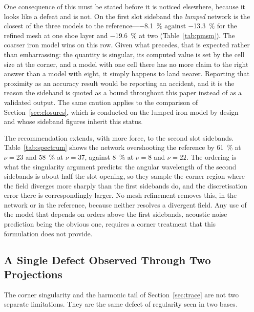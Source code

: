 \documentclass[10pt,a4paper,twocolumn]{article}
\theoremstyle{plain}
\theoremstyle{remark}
\begin{document}
One consequence of this must be stated before it is noticed elsewhere,
because it looks like a defeat and is not. On the first slot sideband
the \emph{lumped} network is the closest of the three models to the
reference---\SI{-8.1}{\percent} against \SI{-13.3}{\percent} for the
refined mesh at one shoe layer and \SI{-19.6}{\percent} at two
(Table~\ref{tab:pmsm}). The coarser iron model wins on this row. Given
what precedes, that is expected rather than embarrassing: the quantity
is singular, its computed value is set by the cell size at the corner,
and a model with one cell there has no more claim to the right answer
than a model with eight, it simply happens to land nearer. Reporting
that proximity as an accuracy result would be reporting an accident, and
it is the reason the sideband is quoted as a bound throughout this paper
instead of as a validated output. The same caution applies to the
comparison of Section~\ref{sec:closures}, which is conducted on the
lumped iron model by design and whose sideband figures inherit this
status.

The recommendation extends, with more force, to the second slot
sidebands. Table~\ref{tab:spectrum} shows the network overshooting the
reference by \SI{61}{\percent} at $\nu=23$ and \SI{58}{\percent} at
$\nu=37$, against \SI{8}{\percent} at $\nu=8$ and $\nu=22$. The ordering
is what the singularity argument predicts: the angular wavelength of the
second sidebands is about half the slot opening, so they sample the
corner region where the field diverges more sharply than the first
sidebands do, and the discretisation error there is correspondingly
larger. No mesh refinement removes this, in the network or in the
reference, because neither resolves a divergent field. Any use of the
model that depends on orders above the first sidebands, acoustic noise
prediction being the obvious one, requires a corner treatment that this
formulation does not provide.

\subsection{A Single Defect Observed Through Two Projections}
\label{sub:unity}

The corner singularity and the harmonic tail of Section~\ref{sec:trace}
are not two separate limitations. They are the same defect of regularity
seen in two bases.
\end{document}
